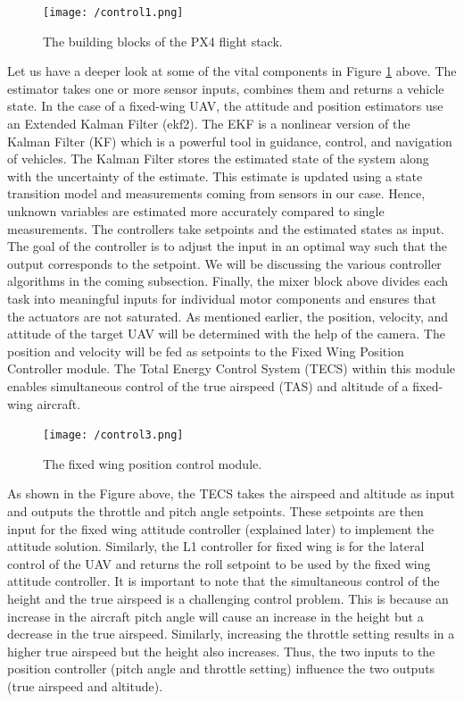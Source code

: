 \documentclass[12pt]{article}
\begin{document}
\begin{figure}[ht]
 	\centering
 	\texttt{[image: /control1.png]}
 	\caption{The building blocks of the PX4 flight stack. \cite{px4}}
        \label{fig:blocks_PX4}
 \end{figure}
\FloatBarrier
\justify Let us have a deeper look at some of the vital components in Figure \ref{fig:blocks_PX4} above. 
\justify The estimator takes one or more sensor inputs, combines them and returns a vehicle state. In the case of a fixed-wing UAV, the attitude and position estimators use an Extended Kalman Filter (ekf2). The EKF is a nonlinear version of the Kalman Filter (KF) which is a powerful tool in guidance, control, and navigation of vehicles. The Kalman Filter stores the estimated state of the system along with the uncertainty of the estimate. This estimate is updated using a state transition model and measurements coming from sensors in our case. Hence, unknown variables are estimated more accurately compared to single measurements. 
\justify The controllers take setpoints and the estimated states as input. The goal of the controller is to adjust the input in an optimal way such that the output corresponds to the setpoint. We will be discussing the various controller algorithms in the coming subsection. 
\justify Finally, the mixer block above divides each task into meaningful inputs for individual motor components and ensures that the actuators are not saturated. 
\justify As mentioned earlier, the position, velocity, and attitude of the target UAV will be determined with the help of the camera. The position and velocity will be fed as setpoints to the Fixed Wing Position Controller module. The Total Energy Control System (TECS) within this module enables simultaneous control of the true airspeed (TAS) and altitude of a fixed-wing aircraft. 
\begin{figure}[ht]
 	\centering
 	\texttt{[image: /control3.png]}
 	\caption{The fixed wing position control module. \cite{px4}}
        \label{fig:moment}
 \end{figure}
\FloatBarrier
\justify As shown in the Figure above, the TECS takes the airspeed and altitude as input and outputs the throttle and pitch angle setpoints. These setpoints are then input for the fixed wing attitude controller (explained later) to implement the attitude solution. Similarly, the L1 controller for fixed wing is for the lateral control of the UAV and returns the roll setpoint to be used by the fixed wing attitude controller.
\justify It is important to note that the simultaneous control of the height and the true airspeed is a challenging control problem. This is because an increase in the aircraft pitch angle will cause an increase in the height but a decrease in the true airspeed. Similarly, increasing the throttle setting results in a higher true airspeed but the height also increases. Thus, the two inputs to the position controller (pitch angle and throttle setting) influence the two outputs (true airspeed and altitude). 
\end{document}
